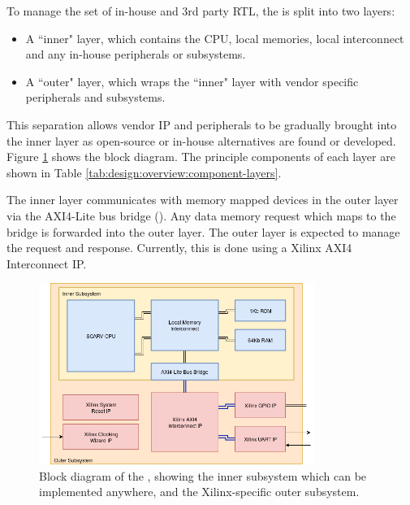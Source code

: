 
To manage the set of in-house and 3rd party RTL,
the \SCARVSOC is split into two layers:

\begin{itemize}[noitemsep]

\item A ``inner" layer, which contains the CPU, local memories, local
    interconnect and any in-house peripherals or subsystems.

\item A ``outer" layer, which wraps the ``inner" layer with vendor specific
    peripherals and subsystems.

\end{itemize}

This separation allows vendor IP and peripherals to be gradually brought
into the inner layer as open-source or in-house alternatives are
found or developed.
Figure \ref{fig:design:soc-blocks} shows the \SCARVSOC block diagram.
The principle components of each layer are shown in 
Table \ref{tab:design:overview:component-layers}.

The inner layer communicates with memory mapped devices in the outer
layer via the AXI4-Lite bus bridge ().
Any data memory request which maps to the bridge is forwarded into
the outer layer.
The outer layer is expected to manage the request and response.
Currently, this is done using a Xilinx AXI4 Interconnect IP.


\begin{figure}
\centering
\includegraphics[width=0.8\textwidth]{image/soc-block-diagram.png}
\caption{
Block diagram of the \SCARVSOC, showing the inner subsystem which can be
implemented anywhere, and the Xilinx-specific outer subsystem.
}
\label{fig:design:soc-blocks}
\end{figure}


